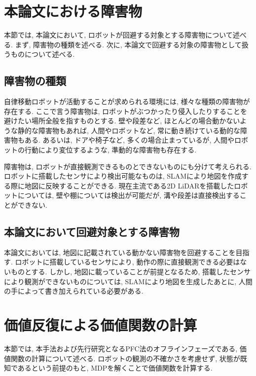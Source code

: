 \section{本論文における障害物} \label{section:障害物}
本節では, 本論文において, ロボットが回避する対象とする障害物について述べる. 
まず, 障害物の種類を述べる. 
次に, 本論文で回避する対象の障害物として扱うものについて述べる. 

\subsection{障害物の種類}
自律移動ロボットが活動することが求められる環境には, 様々な種類の障害物が存在する. 
ここで言う障害物は, ロボットがぶつかったり侵入したりすることを避けたい場所全般を指すものとする. 
壁や段差など, ほとんどの場合動かないような静的な障害物もあれば, 
人間やロボットなど, 常に動き続けている動的な障害物もある. 
あるいは, ドアや椅子など, 多くの場合止まっているが, 人間やロボットの行動により変位するような, 準動的な障害物も存在する. 

障害物は, ロボットが直接観測できるものとできないものにも分けて考えられる. 
ロボットに搭載したセンサにより検出可能なものは, SLAMにより地図を作成する際に地図に反映することができる. 
現在主流である2D LiDARを搭載したロボットについては, 壁や棚については検出が可能だが, 溝や段差は直接検出することができない. 

\subsection{本論文において回避対象とする障害物}
本論文においては, 地図に記載されている動かない障害物を回避することを目指す. 
ロボットに搭載しているセンサにより, 動作の際に直接観測できる必要はないものとする. 
しかし, 地図に載っていることが前提となるため, 
搭載したセンサにより観測ができないものについては, SLAMにより地図を生成したあとに, 
人間の手によって書き加えられている必要がある. 


\section{価値反復による価値関数の計算} \label{section:価値関数}
本節では, 本手法および先行研究となるPFC法のオフラインフェーズである, 価値関数の計算について述べる. 
ロボットの観測の不確かさを考慮せず, 状態が既知であるという前提のもと, MDPを解くことで価値関数を計算する. 

